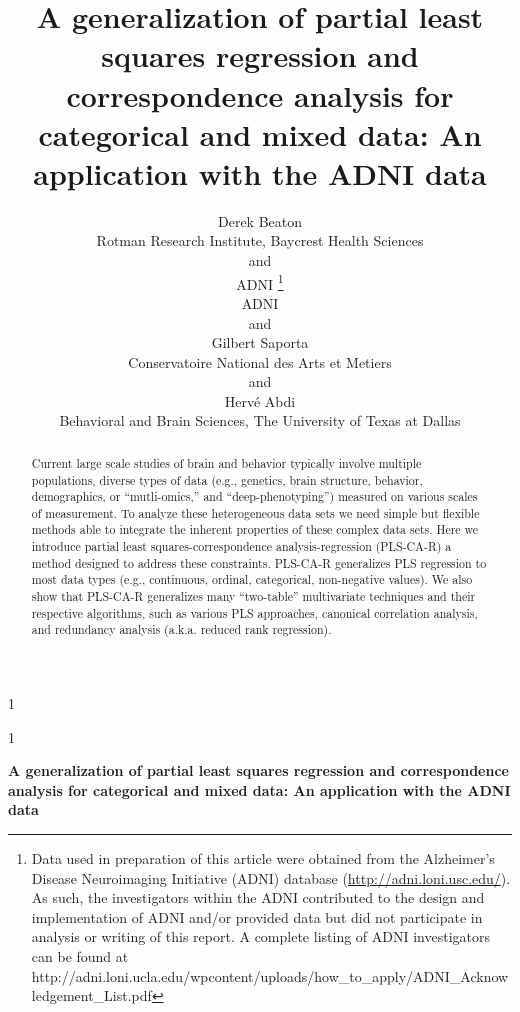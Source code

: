 \documentclass[12pt]{article}
\newcommand{\blind}{1}
\begin{document}
\def\spacingset#1{\renewcommand{\baselinestretch}%
{#1}\small\normalsize} \spacingset{1}



\blind
{
  \title{\bf A generalization of partial least squares regression and correspondence
analysis for categorical and mixed data: An application with the ADNI
data}

  \author{
        Derek Beaton \\
    Rotman Research Institute, Baycrest Health Sciences\\
     and \\     ADNI \thanks{Data used in preparation of this article were obtained from the
Alzheimer's Disease Neuroimaging Initiative (ADNI) database
(\url{http://adni.loni.usc.edu/}). As such, the investigators within the
ADNI contributed to the design and implementation of ADNI and/or
provided data but did not participate in analysis or writing of this
report. A complete listing of ADNI investigators can be found at
http://adni.loni.ucla.edu/wpcontent/uploads/how\_to\_apply/ADNI\_Acknowledgement\_List.pdf} \\
    ADNI\\
     and \\     Gilbert Saporta \\
    Conservatoire National des Arts et Metiers\\
     and \\     Hervé Abdi \\
    Behavioral and Brain Sciences, The University of Texas at Dallas\\
      }
  \maketitle
} \fi

\blind
{
  \bigskip
  \bigskip
  \bigskip
  \begin{center}
    {\LARGE\bf A generalization of partial least squares regression and correspondence
analysis for categorical and mixed data: An application with the ADNI
data}
  \end{center}
  \medskip
} \fi

\bigskip
\begin{abstract}
Current large scale studies of brain and behavior typically involve
multiple populations, diverse types of data (e.g., genetics, brain
structure, behavior, demographics, or ``mutli-omics,'' and
``deep-phenotyping'') measured on various scales of measurement. To
analyze these heterogeneous data sets we need simple but flexible
methods able to integrate the inherent properties of these complex data
sets. Here we introduce partial least squares-correspondence
analysis-regression (PLS-CA-R) a method designed to address these
constraints. PLS-CA-R generalizes PLS regression to most data types
(e.g., continuous, ordinal, categorical, non-negative values). We also
show that PLS-CA-R generalizes many ``two-table'' multivariate
techniques and their respective algorithms, such as various PLS
approaches, canonical correlation analysis, and redundancy analysis
(a.k.a. reduced rank regression).
\end{abstract}
\end{document}
